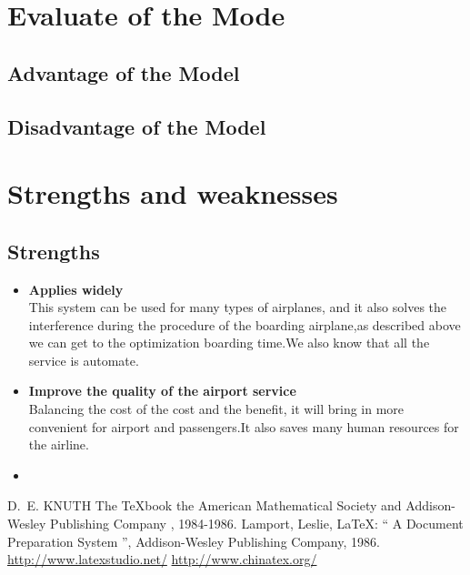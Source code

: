 \documentclass{mcmthesis}
\begin{document}
\section{Evaluate of the Mode}
\subsection{Advantage of the Model}
\subsection{Disadvantage of the Model}

\section{Strengths and weaknesses}
\lipsum[12]

\subsection{Strengths}
\begin{itemize}
	\item \textbf{Applies widely}\\
	This  system can be used for many types of airplanes, and it also
	solves the interference during  the procedure of the boarding
	airplane,as described above we can get to the  optimization
	boarding time.We also know that all the service is automate.
	\item \textbf{Improve the quality of the airport service}\\
	Balancing the cost of the cost and the benefit, it will bring in
	more convenient  for airport and passengers.It also saves many
	human resources for the airline. \item \textbf{}
\end{itemize}

\begin{thebibliography}{99}
 D.~E. KNUTH   The \TeX{}book  the American
Mathematical Society and Addison-Wesley
Publishing Company , 1984-1986.
Lamport, Leslie,  \LaTeX{}: `` A Document Preparation System '',
Addison-Wesley Publishing Company, 1986.
\url{http://www.latexstudio.net/}
\url{http://www.chinatex.org/}
\end{thebibliography}
\end{document}
